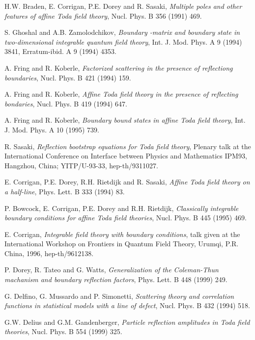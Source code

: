 \documentclass[a4paper,12pt]{report}
\begin{document}
\begin{thebibliography}{23}
 H.W. Braden, E. Corrigan, P.E. Dorey and R. Sasaki, \textit{Multiple poles and other features of
affine Toda field theory}, Nucl. Phys. B 356 (1991) 469.





 S. Ghoshal and A.B. Zamolodchikov, \textit{Boundary \coordHE{}-matrix and boundary state in two-dimensional integrable quantum field theory}, Int. J. Mod. Phys. A 9 (1994) 3841,
Erratum-ibid. A 9 (1994) 4353.

 A. Fring and R. Koberle, \textit{Factorized scattering in the presence of reflectiong boundaries}, Nucl. Phys. B 421 (1994) 159.

 A. Fring and R. Koberle, \textit{Affine Toda field theory in the presence of reflecting bondaries}, Nucl. Phys. B 419 (1994) 647.

 A. Fring and R. Koberle, \textit{Boundary bound states in affine Toda field theory}, Int. J. Mod. Phys. A 10 (1995) 739.

 R. Sasaki, {\it Reflection bootstrap equations for Toda field theory}, Plenary talk at the International
Conference on Interface between Physics and Mathematics IPM93, Hangzhou, China; YITP/U-93-33, hep-th/9311027.

 E. Corrigan, P.E. Dorey, R.H. Rietdijk and R. Sasaki, \textit{Affine Toda field theory on a half-line}, Phys. Lett. B 333 (1994) 83.

 P. Bowcock, E. Corrigan, P.E. Dorey and R.H. Rietdijk, \textit{Classically integrable boundary conditions for affine Toda field theories}, Nucl. Phys. B 445 (1995) 469.

 E. Corrigan, {\it Integrable field theory with boundary conditions}, talk given at the International Workshop
on Frontiers in Quantum Field Theory, Urumqi, P.R. China, 1996, hep-th/9612138.


 P. Dorey, R. Tateo and G. Watts, \textit{Generalization of the Coleman-Thun machanism and boundary reflection factors}, Phys. Lett. B 448 (1999) 249.

 G. Delfino, G. Mussardo and P. Simonetti, \textit{Scattering theory and correlation functions in statistical models with a line of defect}, Nucl. Phys. B 432 (1994) 518.

 G.W. Delius and G.M. Gandenberger, \textit{Particle reflection amplitudes in \coordHE{} Toda field theories}, Nucl. Phys. B 554 (1999) 325.


\end{thebibliography}
\end{document}
